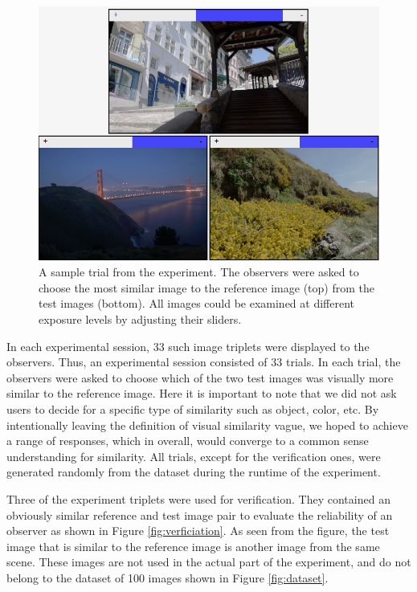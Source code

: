 \begin{figure}
\begin{center}
\includegraphics[width=\textwidth]{figures/chapter3/experiment.png}
\caption{A sample trial from the experiment. The observers were asked to choose the most similar image to the reference image (top) from the test images (bottom). All images could be examined at different exposure levels by adjusting their sliders.
}
\label{fig:experiment}
\end{center}
\end{figure}

In each experimental session, 33 such image triplets were displayed to the observers. Thus, an experimental session consisted of 33 trials. In each trial, the observers were asked to choose which of the two test images was visually more similar to the reference image. Here it is important to note that we did not ask users to decide for a specific type of similarity such as object, color, etc. By intentionally leaving the definition of visual similarity vague, we hoped to achieve a range of responses, which in overall, would converge to a common sense understanding for similarity. All trials, except for the verification ones, were generated randomly from the dataset during the runtime of the experiment. 

Three of the experiment triplets were used for verification. They contained an obviously similar reference and test image pair to evaluate the reliability of an observer as shown in Figure \ref{fig:verficiation}. As seen from the figure, the test image that is similar to the reference image is another image from the same scene. These images are not used in the actual part of the experiment, and do not belong to the dataset of 100 images shown in Figure \ref{fig:dataset}.

